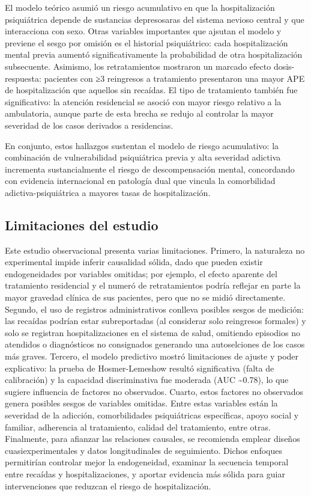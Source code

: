 \documentclass[
  spanish,
  10pt,
]{article}
\begin{document}
El modelo teórico asumió un riesgo acumulativo en que la hospitalización
psiquiátrica depende de sustancias depresosaras del sistema nevioso
central y que interacciona con sexo. Otras variables importantes que
ajsutan el modelo y previene el sesgo por omisión es el historial
psiquiátrico: cada hospitalización mental previa aumentó
significativamente la probabilidad de otra hospitalización subsecuente.
Asimismo, los retratamientos mostraron un marcado efecto
dosis-respuesta: pacientes con ≥3 reingresos a tratamiento presentaron
una mayor APE de hospitalización que aquellos sin recaídas. El tipo de
tratamiento también fue significativo: la atención residencial se asoció
con mayor riesgo relativo a la ambulatoria, aunque parte de esta brecha
se redujo al controlar la mayor severidad de los casos derivados a
residencias.

En conjunto, estos hallazgos sustentan el modelo de riesgo acumulativo:
la combinación de vulnerabilidad psiquiátrica previa y alta severidad
adictiva incrementa sustancialmente el riesgo de descompensación mental,
concordando con evidencia internacional en patología dual que vincula la
comorbilidad adictiva-psiquiátrica a mayores tasas de hospitalización.

\subsection{Limitaciones del estudio}\label{limitaciones-del-estudio}

Este estudio observacional presenta varias limitaciones. Primero, la
naturaleza no experimental impide inferir causalidad sólida, dado que
pueden existir endogeneidades por variables omitidas; por ejemplo, el
efecto aparente del tratamiento residencial y el numeró de
retratamientos podría reflejar en parte la mayor gravedad clínica de sus
pacientes, pero que no se midió directamente. Segundo, el uso de
registros administrativos conlleva posibles sesgos de medición: las
recaídas podrían estar subreportadas (al considerar solo reingresos
formales) y solo se registran hospitalizaciones en el sistema de salud,
omitiendo episodios no atendidos o diagnósticos no consignados generando
una autoselciones de los casos más graves. Tercero, el modelo predictivo
mostró limitaciones de ajuste y poder explicativo: la prueba de
Hosmer-Lemeshow resultó significativa (falta de calibración) y la
capacidad discriminativa fue moderada (AUC \textasciitilde0.78), lo que
sugiere influencia de factores no observados. Cuarto, estos factores no
observados genera posibles sesgos de variables omitidas. Entre estas
variables están la severidad de la adicción, comorbilidades
psiquiátricas específicas, apoyo social y familiar, adherencia al
tratamiento, calidad del tratamiento, entre otras. Finalmente, para
afianzar las relaciones causales, se recomienda emplear diseños
cuasiexperimentales y datos longitudinales de seguimiento. Dichos
enfoques permitirían controlar mejor la endogeneidad, examinar la
secuencia temporal entre recaídas y hospitalizaciones, y aportar
evidencia más sólida para guiar intervenciones que reduzcan el riesgo de
hospitalización.
\end{document}
